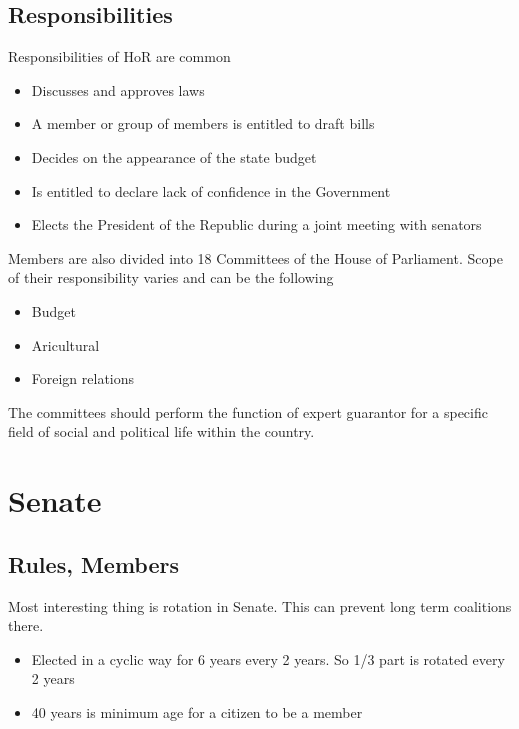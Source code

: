 \documentclass{beamer}
\begin{document}
\subsection{Responsibilities}
\begin{frame}
	Responsibilities of HoR are common
	\begin{itemize}
		\item Discusses and approves laws
		\item A member or group of members is entitled to draft bills
		\item Decides on the appearance of the state budget
		\item Is entitled to declare lack of confidence in the Government
		\item Elects the President of the Republic during a joint meeting with senators
	\end{itemize}
\end{frame}
\begin{frame}
	Members are also divided into 18 Committees of the House of Parliament. Scope of their responsibility varies and can be the following
	\begin{itemize}
		\item Budget
		\item Aricultural
		\item Foreign relations
	\end{itemize}
	The committees should perform the function of expert guarantor for a specific field of social and political life within the country.
\end{frame}
\section{Senate}
\subsection{Rules, Members}
\begin{frame}
	Most interesting thing is rotation in Senate. This can prevent long term coalitions there.
\begin{itemize}
	\item Elected in a cyclic way for 6 years every 2 years. So 1/3 part is rotated every 2 years
	\item 40 years is minimum age for a citizen to be a member
\end{itemize}
\end{frame}
\end{document}
